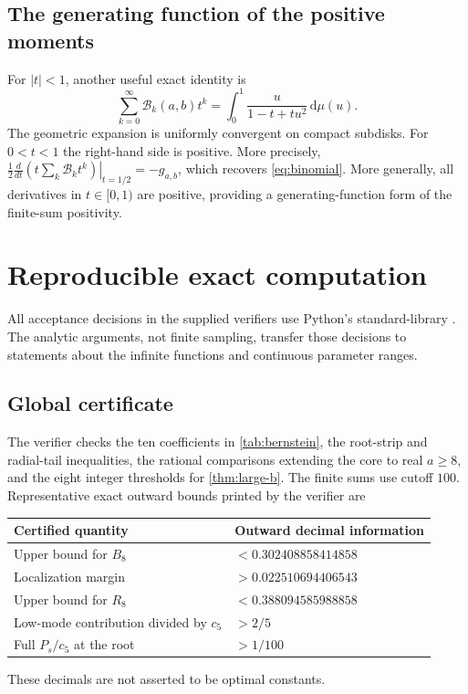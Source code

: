 \documentclass[11pt,letterpaper]{article}
\numberwithin{equation}{section}
\theoremstyle{definition}
\theoremstyle{remark}
\newcommand{\dd}{\,\mathrm d}
\begin{document}
\subsection{The generating function of the positive moments}
For $|t|<1$, another useful exact identity is
\begin{equation}\label{eq:B-generating}
 \sum_{k=0}^\infty\mathcal B_k(a,b)t^k
 =\int_0^1\frac{u}{1-t+tu^2}\dd\mu(u).
\end{equation}
The geometric expansion is uniformly convergent on compact subdisks.
For $0<t<1$ the right-hand side is positive. More precisely,
$\left.\tfrac12\frac{d}{dt}(t\sum_k\mathcal B_kt^k)\right|_{t=1/2}
=-g_{a,b}$, which recovers \eqref{eq:binomial}. More generally, all derivatives in $t\in[0,1)$
are positive, providing a generating-function form of the finite-sum
positivity.

\section{Reproducible exact computation}
\label{sec:computation}
All acceptance decisions in the supplied verifiers use Python's
standard-library . The analytic arguments,
not finite sampling, transfer those decisions to statements about the
infinite functions and continuous parameter ranges.

\subsection{Global certificate}
The verifier  checks the ten coefficients
in \cref{tab:bernstein}, the root-strip and radial-tail inequalities,
the rational comparisons extending the core to real $a\ge8$, and the
eight integer thresholds for \cref{thm:large-b}.
The finite sums use cutoff $100$. Representative exact outward bounds
printed by the verifier are
\begin{center}
\begin{tabular}{@{}ll@{}}
\toprule
Certified quantity & Outward decimal information\\
\midrule
Upper bound for $B_8$ & $<0.302408858414858$\\
Localization margin & $>0.022510694406543$\\
Upper bound for $R_8$ & $<0.388094585988858$\\
Low-mode contribution divided by $c_5$ & $>2/5$\\
Full $P_s/c_5$ at the root & $>1/100$\\
\bottomrule
\end{tabular}
\end{center}
These decimals are not asserted to be optimal constants.
\end{document}
